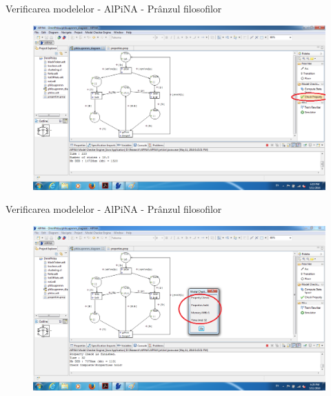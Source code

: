 \documentclass{beamer}
\begin{document}
\begin{frame}{Verificarea modelelor - AlPiNA - Prânzul filosofilor}
\begin{figure}
\centering
\includegraphics[scale=0.32]{images/alpina5}
\end{figure}
\end{frame}



\begin{frame}{Verificarea modelelor - AlPiNA - Prânzul filosofilor}
\begin{figure}
\centering
\includegraphics[scale=0.32]{images/alpina6}
\end{figure}
\end{frame}
\end{document}
